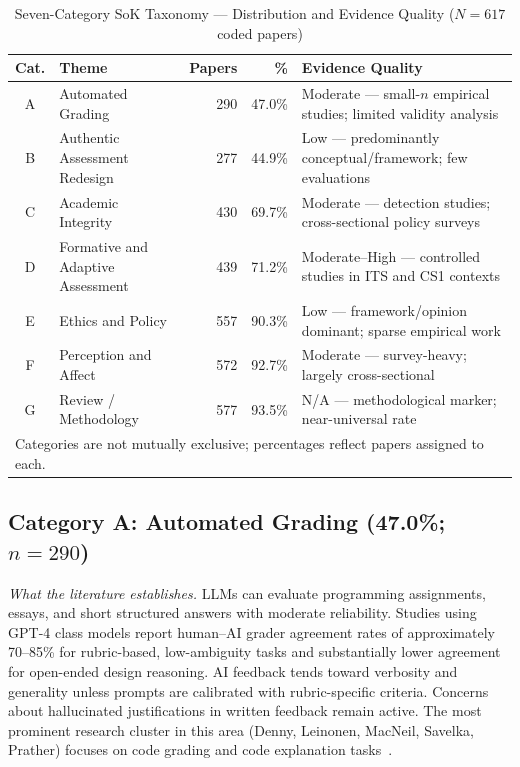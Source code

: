 \documentclass[conference]{IEEEtran}
\begin{document}
\begin{table}[ht]
\caption{Seven-Category SoK Taxonomy --- Distribution and Evidence Quality ($N = 617$ coded papers)}
\label{tab:taxonomy}
\centering
\begin{tabular}{clrrp{6.8cm}}
\toprule
\textbf{Cat.} & \textbf{Theme} & \textbf{Papers} & \textbf{\%} & \textbf{Evidence Quality} \\
\midrule
A & Automated Grading              & 290 & 47.0\% & Moderate --- small-$n$ empirical studies; limited validity analysis \\
B & Authentic Assessment Redesign  & 277 & 44.9\% & Low --- predominantly conceptual/framework; few evaluations \\
C & Academic Integrity             & 430 & 69.7\% & Moderate --- detection studies; cross-sectional policy surveys \\
D & Formative and Adaptive Assessment & 439 & 71.2\% & Moderate--High --- controlled studies in ITS and CS1 contexts \\
E & Ethics and Policy              & 557 & 90.3\% & Low --- framework/opinion dominant; sparse empirical work \\
F & Perception and Affect          & 572 & 92.7\% & Moderate --- survey-heavy; largely cross-sectional \\
G & Review / Methodology           & 577 & 93.5\% & N/A --- methodological marker; near-universal rate \\
\bottomrule
\multicolumn{5}{l}{\footnotesize Categories are not mutually exclusive; percentages reflect papers assigned to each.}
\end{tabular}
\end{table}

\subsection{Category A: Automated Grading (47.0\%; $n = 290$)}

\textit{What the literature establishes.}
LLMs can evaluate programming assignments, essays, and short structured answers with moderate
reliability. Studies using GPT-4 class models report human--AI grader agreement rates of
approximately 70--85\% for rubric-based, low-ambiguity tasks and substantially lower agreement
for open-ended design reasoning. AI feedback tends toward verbosity and generality unless prompts
are calibrated with rubric-specific criteria. Concerns about hallucinated justifications in written
feedback remain active. The most prominent research cluster in this area (Denny, Leinonen, MacNeil,
Savelka, Prather) focuses on code grading and code explanation tasks~\cite{macneil2023,savelka2023}.
\end{document}
